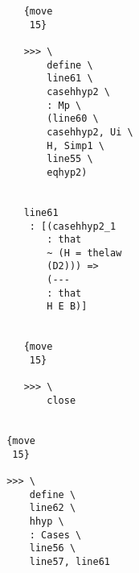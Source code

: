 \documentclass[12pt]{article}
\begin{document}
\begin{verbatim}
                                                {move 
                                                 15}

                                                >>> \
                                                    define \
                                                    line61 \
                                                    casehhyp2 \
                                                    : Mp \
                                                    (line60 \
                                                    casehhyp2, Ui \
                                                    H, Simp1 \
                                                    line55 \
                                                    eqhyp2)


                                                line61 
                                                 : [(casehhyp2_1 
                                                    : that 
                                                    ~ (H = thelaw 
                                                    (D2))) => 
                                                    (--- 
                                                    : that 
                                                    H E B)]


                                                {move 
                                                 15}

                                                >>> \
                                                    close


                                             {move 
                                              15}

                                             >>> \
                                                 define \
                                                 line62 \
                                                 hhyp \
                                                 : Cases \
                                                 line56 \
                                                 line57, line61



\end{verbatim}
\end{document}
